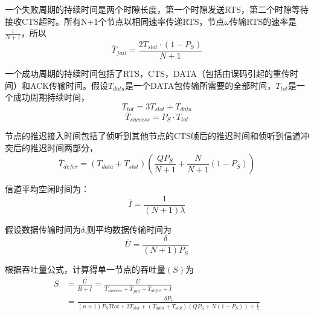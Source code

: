 一个失败周期的持续时间是两个时隙长度，第一个时隙发送RTS，第二个时隙等待接收CTS超时。所有N+1个节点以相同速率传递RTS，节点$\omega$传输RTS的速率是$\frac{1}{N+1}$，所以
\begin{equation}
\overline T_{fail}=\frac{{2T_{slot}}\cdot(1-P_S)}{N+1}
\end{equation}

一个成功周期的持续时间包括了RTS，CTS，DATA（包括由误码引起的重传时间）和ACK传输时间。假设$T_{data}$是一个DATA包传输所需要的全部时间，$T_{tot}$是一个成功周期持续时间，
\begin{equation}
T_{tot}=3T_{slot}+T_{data}
\end{equation}
\begin{equation}
\overline T_{success}=P_S \cdot T_{tot}
\end{equation}

节点的推迟接入时间包括了侦听到其他节点的CTS帧后的推迟时间和侦听到信道冲突后的推迟时间两部分，
\begin{equation}
\overline T_{defer}=(T_{data}+T_{slot})(\frac{QP_S}{N+1}+\frac{N}{N+1}(1-P_S)) 
\end{equation}

信道平均空闲时间为：
\begin{equation}
\overline I=\frac{1}{(N+1)\lambda}
\end{equation}

假设数据传输时间为$\delta$,则平均数据传输时间为
\begin{equation}
\overline U=\frac{\delta}{(N+1)P_S}
\end{equation}

根据吞吐量公式，计算得单一节点的吞吐量$(S)$为
\begin{equation}
\begin{aligned}
S&=\frac{\overline U}{\overline B+\overline I}=\frac{\overline U}{\overline T_{success}+\overline T_{fail}+\overline T_{defer}+\overline I}\\
&=\frac{\delta P_s}{(n+1)P_S T{tot}+2T_{slot}+(T_{data}+T_{slot})(QP_S+N(1-P_S))+\frac{1}{\lambda}}
\end{aligned}
\end{equation}

\endinput